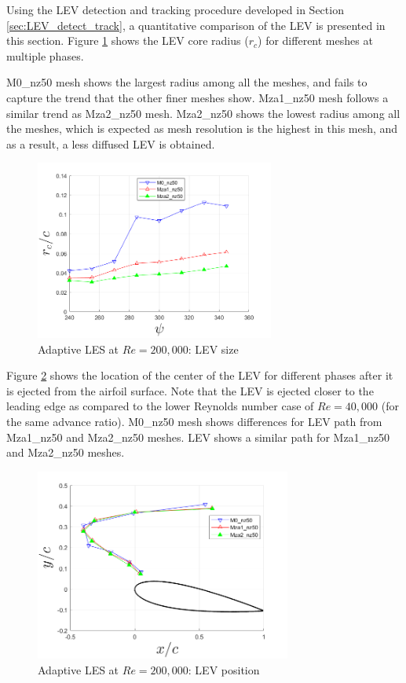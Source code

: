 Using the LEV detection and tracking procedure developed in Section \ref{sec:LEV_detect_track}, a quantitative comparison of the LEV is presented in this section. 
Figure \ref{fig:zonal_LEV_radius_Re200k} shows the LEV core radius ($r_c$) for different meshes at multiple phases.

M0\_nz50 mesh shows the largest radius among all the meshes, and fails to capture the trend that the other finer meshes show.
Mza1\_nz50 mesh follows a similar trend as Mza2\_nz50 mesh.
Mza2\_nz50 shows the lowest radius among all the meshes, which is expected as mesh resolution is the highest in this mesh, and as a result, a less diffused LEV is obtained.

\begin{figure}[H]
	\centering
	\includegraphics[width=0.7\textwidth]{figures/zonal_adapt_results/LEV_Re200k/LEV_radius_vp}
	\caption{ Adaptive LES at $Re = 200,000$: LEV size}
	\label{fig:zonal_LEV_radius_Re200k}
\end{figure}

Figure \ref{fig:zonal_LEV_location_Re200k} shows the location of the center of the LEV for different phases after it is ejected from the airfoil surface. 
Note that the LEV is ejected closer to the leading edge as compared to the lower Reynolds number case of $Re=40,000$ (for the same advance ratio).
M0\_nz50 mesh shows differences for LEV path from Mza1\_nz50 and Mza2\_nz50 meshes. LEV shows a similar path for Mza1\_nz50 and Mza2\_nz50 meshes.

\begin{figure}[H]
	\centering
	\includegraphics[width=0.75\textwidth]{figures/zonal_adapt_results/LEV_Re200k/LEV_location_Re200k}
	\caption{ Adaptive LES at $Re = 200,000$: LEV position}
	\label{fig:zonal_LEV_location_Re200k}
\end{figure}

